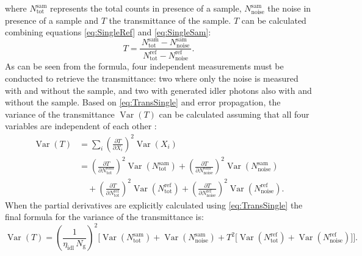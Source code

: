 where $N_{\text{tot}}^{\text{sam}}$ represents the total counts in presence of a sample, $N_{\text{noise}}^{\text{sam}}$ the noise in presence of a sample and $T$ the transmittance of the sample. \newline
$T$ can be calculated combining equations \ref{eq:SingleRef} and \ref{eq:SingleSam}:
\begin{equation}
	T = 
	\frac{\,N_{\text{tot}}^{\text{sam}} - N_{\text{noise}}^{\text{sam}}\,}
	{\,N_{\text{tot}}^{\text{ref}} - N_{\text{noise}}^{\text{ref}}\,}.
	\label{eq:TransSingle}
\end{equation}
As can be seen from the formula, four independent measurements must be conducted to retrieve the transmittance: two where only the noise is measured with and without the sample, and two with generated idler photons also with and without the sample. \newline
Based on \autoref{eq:TransSingle} and error propagation, the variance of the transmittance $\operatorname{Var}(T)$ can be calculated assuming that all four variables are independent of each other \cite{kuNotesUsePropagation1966}: 
\begin{equation}
	\begin{aligned}
		\operatorname{Var}(T) 
		&= \sum_{i} \left( \frac{\partial T}{\partial X_i} \right)^{2} 
		\operatorname{Var}\!\left( X_i \right) \\[0.75em]
		&= \left( \frac{\partial T}{\partial N_{\text{tot}}^{\text{sam}}} \right)^{2} 
		\operatorname{Var}\!\left( N_{\text{tot}}^{\text{sam}} \right)
		+ \left( \frac{\partial T}{\partial N_{\text{noise}}^{\text{sam}}} \right)^{2} 
		\operatorname{Var}\!\left( N_{\text{noise}}^{\text{sam}} \right) \\[0.75em]
		&\quad + \left( \frac{\partial T}{\partial N_{\text{tot}}^{\text{ref}}} \right)^{2} 
		\operatorname{Var}\!\left( N_{\text{tot}}^{\text{ref}} \right)
		+ \left( \frac{\partial T}{\partial N_{\text{noise}}^{\text{ref}}} \right)^{2} 
		\operatorname{Var}\!\left( N_{\text{noise}}^{\text{ref}} \right).
	\end{aligned}
	\label{eq:VarianceTransGen}
\end{equation}
When the partial derivatives are explicitly calculated using \autoref{eq:TransSingle} the final formula for the variance of the transmittance is:
\begin{equation}
		\operatorname{Var}(T) 
		= \left( \frac{1}{\eta_{\text{idl}}\,N_{\mathrm{g}}} \right)^{2}
		\Bigg[
		\operatorname{Var}\!\left(N_{\text{tot}}^{\text{sam}}\right) 
		+ \operatorname{Var}\!\left(N_{\text{noise}}^{\text{sam}}\right) 
		+ T^{2} \Big[ 
		\operatorname{Var}\!\left(N_{\text{tot}}^{\text{ref}}\right) 
		+ \operatorname{Var}\!\left(N_{\text{noise}}^{\text{ref}}\right) 
		\Big]
		\Bigg].
	\label{eq:VarianceTransExpl}
\end{equation}
